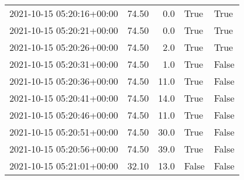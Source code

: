 \begin{tabular}{lrrll}
2021-10-15 05:20:16+00:00 &      74.50 &      0.0 &             True &              True \\
2021-10-15 05:20:21+00:00 &      74.50 &      0.0 &             True &              True \\
2021-10-15 05:20:26+00:00 &      74.50 &      2.0 &             True &              True \\
2021-10-15 05:20:31+00:00 &      74.50 &      1.0 &             True &             False \\
2021-10-15 05:20:36+00:00 &      74.50 &     11.0 &             True &             False \\
2021-10-15 05:20:41+00:00 &      74.50 &     14.0 &             True &             False \\
2021-10-15 05:20:46+00:00 &      74.50 &     11.0 &             True &             False \\
2021-10-15 05:20:51+00:00 &      74.50 &     30.0 &             True &             False \\
2021-10-15 05:20:56+00:00 &      74.50 &     39.0 &             True &             False \\
2021-10-15 05:21:01+00:00 &      32.10 &     13.0 &            False &             False \\
\bottomrule
\end{tabular}
